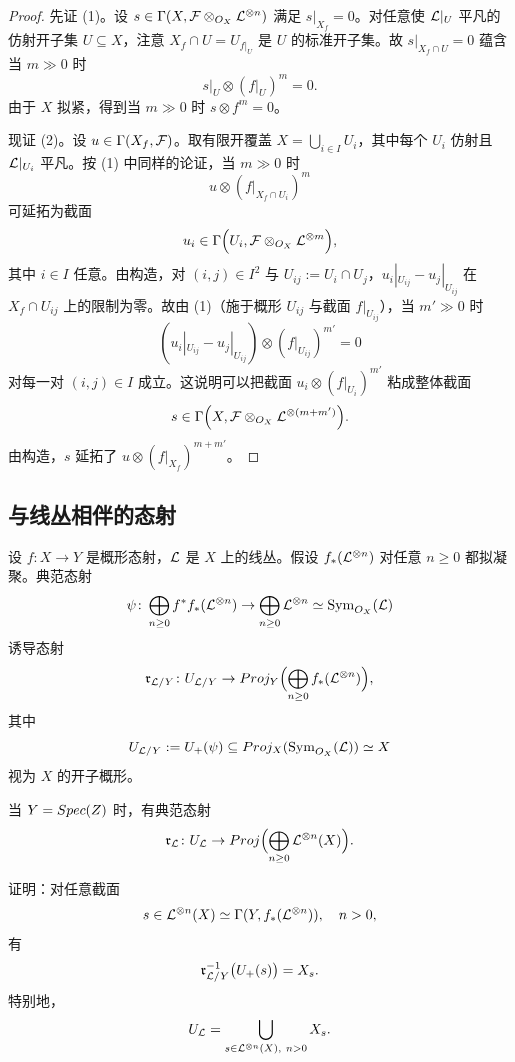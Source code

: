 \begin{proof}
先证 (1)。设 $s\in\Gamma(X,\mathcal{F}\otimes_{O_X}\mathcal{L}^{\otimes n})$ 满足 $s|_{X_f}=0$。对任意使 $\mathcal{L}|_U$ 平凡的仿射开子集 $U\subseteq X$，注意 $X_f\cap U=U_{f|_U}$ 是 $U$ 的标准开子集。故 $s|_{X_f\cap U}=0$ 蕴含当 $m\gg 0$ 时
\[
s|_U\otimes (f|_U)^m = 0.
\]
由于 $X$ 拟紧，得到当 $m\gg 0$ 时 $s\otimes f^m=0$。

现证 (2)。设 $u\in\Gamma(X_f,\mathcal{F})$。取有限开覆盖 $X=\bigcup_{i\in I}U_i$，其中每个 $U_i$ 仿射且 $\mathcal{L}|_{U_i}$ 平凡。按 (1) 中同样的论证，当 $m\gg 0$ 时
\[
u\otimes (f|_{X_f\cap U_i})^m
\]
可延拓为截面
\[
u_i \in \Gamma\Bigl(U_i,\mathcal{F}\otimes_{O_X}\mathcal{L}^{\otimes m}\Bigr),
\]
其中 $i\in I$ 任意。由构造，对 $(i,j)\in I^2$ 与 $U_{ij}:=U_i\cap U_j$，$u_i|_{U_{ij}}-u_j|_{U_{ij}}$ 在 $X_f\cap U_{ij}$ 上的限制为零。故由 (1)（施于概形 $U_{ij}$ 与截面 $f|_{U_{ij}}$），当 $m'\gg 0$ 时
\[
(u_i|_{U_{ij}}-u_j|_{U_{ij}})\otimes (f|_{U_{ij}})^{m'} = 0
\]
对每一对 $(i,j)\in I$ 成立。这说明可以把截面 $u_i\otimes (f|_{U_i})^{m'}$ 粘成整体截面
\[
s\in\Gamma\Bigl(X,\mathcal{F}\otimes_{O_X}\mathcal{L}^{\otimes (m+m')}\Bigr).
\]
由构造，$s$ 延拓了 $u\otimes (f|_{X_f})^{m+m'}$。
\end{proof}

\subsection{与线丛相伴的态射}\label{sec:28.2}

\begin{construction}\label{con:28.2.1}
设 $f\colon X\to Y$ 是概形态射，$\mathcal{L}$ 是 $X$ 上的线丛。假设 $f_*(\mathcal{L}^{\otimes n})$ 对任意 $n\ge 0$ 都拟凝聚。典范态射
\[
\psi\colon \bigoplus_{n\ge 0}f^*f_*(\mathcal{L}^{\otimes n}) \to \bigoplus_{n\ge 0}\mathcal{L}^{\otimes n} \simeq \operatorname{Sym}_{O_X}(\mathcal{L})
\]
诱导态射
\[
\mathfrak r_{\mathcal{L}/Y}\colon U_{\mathcal{L}/Y} \to Proj_Y\Bigl(\bigoplus_{n\ge 0}f_*(\mathcal{L}^{\otimes n})\Bigr),
\]
其中
\[
U_{\mathcal{L}/Y} := U_+(\psi) \subseteq Proj_X(\operatorname{Sym}_{O_X}(\mathcal{L})) \simeq X
\]
视为 $X$ 的开子概形。

当 $Y=Spec(Z)$ 时，有典范态射
\[
\mathfrak r_{\mathcal{L}}\colon U_{\mathcal{L}} \to Proj\Bigl(\bigoplus_{n\ge 0}\mathcal{L}^{\otimes n}(X)\Bigr).
\]
\end{construction}

\begin{exercise}\label{exc:28.2.2}
证明：对任意截面
\[
s\in\mathcal{L}^{\otimes n}(X)\simeq\Gamma(Y,f_*(\mathcal{L}^{\otimes n})),\quad n>0,
\]
有
\[
\mathfrak r_{\mathcal{L}/Y}^{-1}\bigl(U_+(s)\bigr) = X_s.
\]
特别地，
\[
U_{\mathcal{L}} = \bigcup_{s\in\mathcal{L}^{\otimes n}(X),\ n>0}X_s.
\]
\end{exercise}

